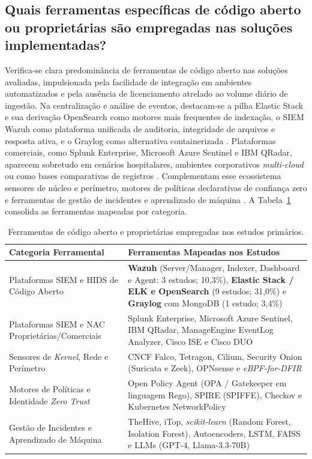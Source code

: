 \subsection{Quais ferramentas específicas de código aberto ou proprietárias são empregadas nas soluções implementadas?}
\label{subsec:rsl_qs05}

Verifica-se clara predominância de ferramentas de código aberto nas soluções avaliadas, impulsionada pela facilidade de integração em ambientes automatizados e pela ausência de licenciamento atrelado ao volume diário de ingestão. Na centralização e análise de eventos, destacam-se a pilha Elastic Stack e sua derivação OpenSearch como motores mais frequentes de indexação, o SIEM Wazuh como plataforma unificada de auditoria, integridade de arquivos e resposta ativa, e o Graylog como alternativa containerizada \cite{jin2025,sushma2025,acosta2025,bungei2026,setiawan2025,velasquez2025}. Plataformas comerciais, como Splunk Enterprise, Microsoft Azure Sentinel e IBM QRadar, aparecem sobretudo em cenários hospitalares, ambientes corporativos \textit{multi-cloud} ou como bases comparativas de registros \cite{coutinho2023,kumar2026,aftab2026,velasquez2025,portillo2019}. Complementam esse ecossistema sensores de núcleo e perímetro, motores de políticas declarativas de confiança zero e ferramentas de gestão de incidentes e aprendizado de máquina \cite{shao2026a,kalafatidis2025,xu2025,darwesh2024,devarajulu2025}. A Tabela~\ref{tab:rsl_qs05} consolida as ferramentas mapeadas por categoria.

\begin{table}[!htbp]
    \centering
    \caption{Ferramentas de código aberto e proprietárias empregadas nos estudos primários.}
    \label{tab:rsl_qs05}
    \footnotesize
    \begin{tabular}{p{4.4cm}p{9.6cm}}
        \hline
        \textbf{Categoria Ferramental} & \textbf{Ferramentas Mapeadas nos Estudos} \\ \hline
        Plataformas SIEM e HIDS de Código Aberto & \textbf{Wazuh} (Server/Manager, Indexer, Dashboard e Agent: 3 estudos; 10,3\%), \textbf{Elastic Stack / ELK e OpenSearch} (9 estudos; 31,0\%) e \textbf{Graylog} com MongoDB (1 estudo; 3,4\%) \\ \hline
        Plataformas SIEM e NAC Proprietárias/Comerciais & Splunk Enterprise, Microsoft Azure Sentinel, IBM QRadar, ManageEngine EventLog Analyzer, Cisco ISE e Cisco DUO \\ \hline
        Sensores de \textit{Kernel}, Rede e Perímetro & CNCF Falco, Tetragon, Cilium, Security Onion (Suricata e Zeek), OPNsense e \textit{eBPF-for-DFIR} \\ \hline
        Motores de Políticas e Identidade \textit{Zero Trust} & Open Policy Agent (OPA / Gatekeeper em linguagem Rego), SPIRE (SPIFFE), Checkov e Kubernetes NetworkPolicy \\ \hline
        Gestão de Incidentes e Aprendizado de Máquina & TheHive, iTop, \textit{scikit-learn} (Random Forest, Isolation Forest), Autoencoders, LSTM, FAISS e LLMs (GPT-4, Llama-3.3-70B) \\ \hline
    \end{tabular}
\end{table}
\FloatBarrier

